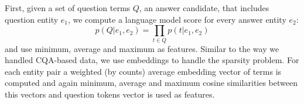First, given a set of question terms $Q$, an answer candidate, that includes question entity $e_1$, we compute a language model score for every answer entity $e_2$:
$$p(Q|e_1, e_2) = \prod_{t\in Q} p(t | e_1, e_2)$$
and use minimum, average and maximum as features.
Similar to the way we handled CQA-based data, we use embeddings to handle the sparsity problem.
For each entity pair a weighted (by counts) average embedding vector of terms is computed and again minimum, average and maximum cosine similarities between this vectors and question tokens vector is used as features.

